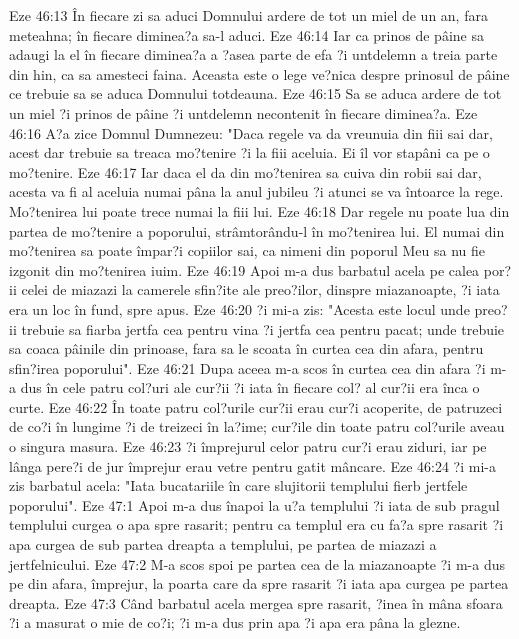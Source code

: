 Eze 46:13  În fiecare zi sa aduci Domnului ardere de tot un miel de un an, fara meteahna; în fiecare diminea?a sa-l aduci.
Eze 46:14  Iar ca prinos de pâine sa adaugi la el în fiecare diminea?a a ?asea parte de efa ?i untdelemn a treia parte din hin, ca sa amesteci faina. Aceasta este o lege ve?nica despre prinosul de pâine ce trebuie sa se aduca Domnului totdeauna.
Eze 46:15  Sa se aduca ardere de tot un miel ?i prinos de pâine ?i untdelemn necontenit în fiecare diminea?a.
Eze 46:16  A?a zice Domnul Dumnezeu: "Daca regele va da vreunuia din fiii sai dar, acest dar trebuie sa treaca mo?tenire ?i la fiii aceluia. Ei îl vor stapâni ca pe o mo?tenire.
Eze 46:17  Iar daca el da din mo?tenirea sa cuiva din robii sai dar, acesta va fi al aceluia numai pâna la anul jubileu ?i atunci se va întoarce la rege. Mo?tenirea lui poate trece numai la fiii lui.
Eze 46:18  Dar regele nu poate lua din partea de mo?tenire a poporului, strâmtorându-l în mo?tenirea lui. El numai din mo?tenirea sa poate împar?i copiilor sai, ca nimeni din poporul Meu sa nu fie izgonit din mo?tenirea iuim.
Eze 46:19  Apoi m-a dus barbatul acela pe calea por?ii celei de miazazi la camerele sfin?ite ale preo?ilor, dinspre miazanoapte, ?i iata era un loc în fund, spre apus.
Eze 46:20  ?i mi-a zis: "Acesta este locul unde preo?ii trebuie sa fiarba jertfa cea pentru vina ?i jertfa cea pentru pacat; unde trebuie sa coaca pâinile din prinoase, fara sa le scoata în curtea cea din afara, pentru sfin?irea poporului".
Eze 46:21  Dupa aceea m-a scos în curtea cea din afara ?i m-a dus în cele patru col?uri ale cur?ii ?i iata în fiecare col? al cur?ii era înca o curte.
Eze 46:22  În toate patru col?urile cur?ii erau cur?i acoperite, de patruzeci de co?i în lungime ?i de treizeci în la?ime; cur?ile din toate patru col?urile aveau o singura masura.
Eze 46:23  ?i împrejurul celor patru cur?i erau ziduri, iar pe lânga pere?i de jur împrejur erau vetre pentru gatit mâncare.
Eze 46:24  ?i mi-a zis barbatul acela: "Iata bucatariile în care slujitorii templului fierb jertfele poporului".
Eze 47:1  Apoi m-a dus înapoi la u?a templului ?i iata de sub pragul templului curgea o apa spre rasarit; pentru ca templul era cu fa?a spre rasarit ?i apa curgea de sub partea dreapta a templului, pe partea de miazazi a jertfelnicului.
Eze 47:2  M-a scos spoi pe partea cea de la miazanoapte ?i m-a dus pe din afara, împrejur, la poarta care da spre rasarit ?i iata apa curgea pe partea dreapta.
Eze 47:3  Când barbatul acela mergea spre rasarit, ?inea în mâna sfoara ?i a masurat o mie de co?i; ?i m-a dus prin apa ?i apa era pâna la glezne.
